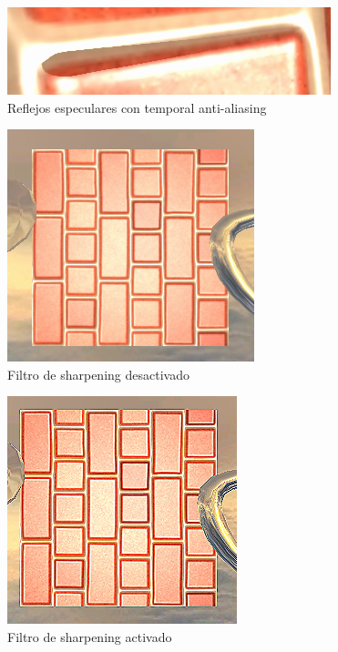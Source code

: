 \documentclass[withindex, glossary]{cam-thesis}
\begin{document}
\begin{figure}[!htbp]
    \includegraphics[width=.8\linewidth]{figures/shadowtaaON.png}
    \caption{Reflejos especulares con temporal anti-aliasing\label{shadowtaaON}}
\end{figure}

\begin{figure}[!htbp]
    \includegraphics[width=.8\linewidth]{figures/sharpOFFsmall.png}
    \caption{Filtro de sharpening desactivado\label{sharpOFFsmall}}
\end{figure}

\begin{figure}[!htbp]
    \includegraphics[width=.8\linewidth]{figures/sharpONsmall.png}
    \caption{Filtro de sharpening activado\label{sharpOnsmall}}
\end{figure}
\end{document}
